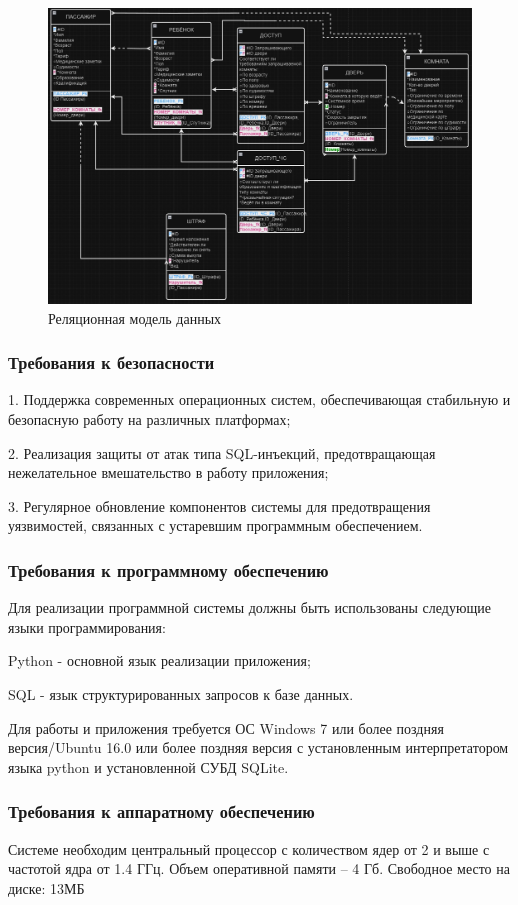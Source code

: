 \begin{figure}[ht]
	\centering
	\includegraphics[width=1\linewidth]{images/CommonScheme3}
	\caption{Реляционная модель данных}
	\label{fig:commonscheme3}
\end{figure}

\subsubsection{Требования к безопасности}
1. Поддержка современных операционных систем, обеспечивающая стабильную и безопасную работу на различных платформах;

2. Реализация защиты от атак типа SQL-инъекций, предотвращающая нежелательное вмешательство в работу приложения;

3. Регулярное обновление компонентов системы для предотвращения уязвимостей, связанных с устаревшим программным обеспечением.

\subsubsection{Требования к программному обеспечению}
Для реализации программной системы должны быть использованы следующие языки программирования: 

Python - основной язык реализации приложения; 

SQL - язык структурированных запросов к базе данных.

Для работы и приложения требуется ОС Windows 7 или более поздняя версия/Ubuntu 16.0 или более поздняя версия с установленным интерпретатором языка python и установленной СУБД SQLite.

\subsubsection{Требования к аппаратному обеспечению}
Системе необходим центральный процессор с количеством ядер от 2 и выше с частотой ядра от 1.4 ГГц. Объем оперативной памяти – 4 Гб.
Свободное место на диске: 13МБ

